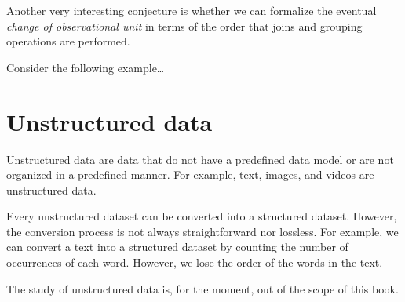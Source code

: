 Another very interesting conjecture is whether we can formalize the eventual \emph{change
of observational unit} in terms of the order that joins and grouping operations are
performed.

Consider the following example\dots

\section{Unstructured data}

Unstructured data are data that do not have a predefined data model or are not organized
in a predefined manner.  For example, text, images, and videos are unstructured data.

Every unstructured dataset can be converted into a structured dataset.  However, the
conversion process is not always straightforward nor lossless.  For example, we can
convert a text into a structured dataset by counting the number of occurrences of each
word.  However, we lose the order of the words in the text.

The study of unstructured data is, for the moment, out of the scope of this book.
